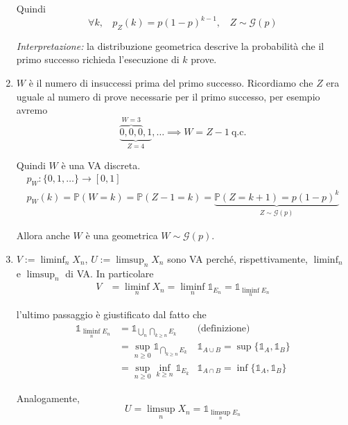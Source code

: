 \begin{enumerate}
Quindi\begin{equation*}
\forall k,\ \ \ \ p_{Z}( k) =p( 1-p)^{k-1} ,\ \ \ \ \boxed{Z\sim \mathcal{G}( p)}
\end{equation*}

\textit{Interpretazione:} la distribuzione geometrica descrive la probabilità che il primo successo richieda l'esecuzione di $k$ prove.
\item $W$ è il numero di insuccessi prima del primo successo. Ricordiamo che $Z$ era uguale al numero di prove necessarie per il primo successo, per esempio avremo\begin{equation*}
\underbrace{\overbrace{0,0,0}^{W=3} ,1}_{Z=4} ,\dotsc \implies W=Z-1\ \text{q.c.}
\end{equation*}

Quindi $W$ è una VA discreta.\begin{gather*}
p_{W} :\{0,1,\dotsc \}\rightarrow [ 0,1]\\
p_{W}( k) =\mathbb{P}( W=k) =\mathbb{P}( Z-1=k) =\underbrace{\mathbb{P}( Z=k+1) =p( 1-p)^{k}}_{Z\sim \mathcal{G}( p)}
\end{gather*}

Allora anche $W$ è una geometrica $W\sim \mathcal{G}( p)$.
\item $V:=\liminf _{n} X_{n}$, $U:=\limsup _{n} X_{n}$ sono VA perché, rispettivamente, $\liminf _{n}$ e $\limsup _{n}$ di VA. In particolare\begin{align*}
V & =\liminf _{n} X_{n} =\liminf _{n}\mathbb{1}_{E_{n}} =\mathbb{1}_{\liminf\limits _{n} E_{n}}
\end{align*}

l'ultimo passaggio è giustificato dal fatto che\begin{equation*}
\begin{aligned}
\mathbb{1}_{\liminf _{n} E_{n}} & =\mathbb{1}_{\bigcup\limits _{n}\bigcap\limits _{k\geq n} E_{k}} & \text{(definizione)}\\
 & =\sup\limits _{n\geq 0}\mathbb{1}_{\bigcap\limits _{k\geq n} E_{k}} & \mathbb{1}_{A\cup B} =\sup \{\mathbb{1}_{A} ,\mathbb{1}_{B}\}\\
 & =\sup _{n\geq 0}\inf_{k\geq n}\mathbb{1}_{E_{k}} & \mathbb{1}_{A\cap B} =\inf\{\mathbb{1}_{A} ,\mathbb{1}_{B}\}
\end{aligned}
\end{equation*}

Analogamente,\begin{equation*}
U=\limsup _{n} X_{n} =\mathbb{1}_{\limsup\limits _{n} E_{n}}
\end{equation*}


\end{enumerate}
